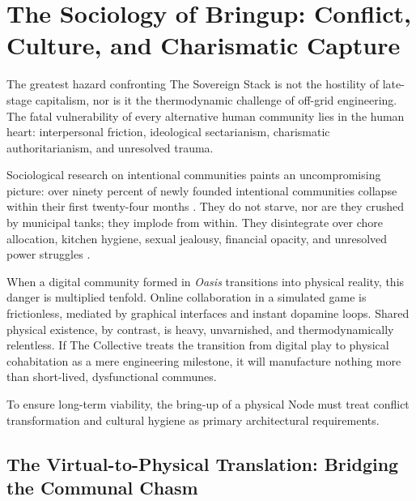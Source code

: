 \section[The Sociology of Bringup]{The Sociology of Bringup: Conflict, Culture, and Charismatic Capture}
\label{sec:bringup-sociology}

The greatest hazard confronting The Sovereign Stack is not the hostility of late-stage capitalism, nor is it the thermodynamic challenge of off-grid engineering. The fatal vulnerability of every alternative human community lies in the human heart: interpersonal friction, ideological sectarianism, charismatic authoritarianism, and unresolved trauma.

Sociological research on intentional communities paints an uncompromising picture: over ninety percent of newly founded intentional communities collapse within their first twenty-four months \parencite{christian2003}. They do not starve, nor are they crushed by municipal tanks; they implode from within. They disintegrate over chore allocation, kitchen hygiene, sexual jealousy, financial opacity, and unresolved power struggles \parencite{kanter1972}.

When a digital community formed in \textit{Oasis} transitions into physical reality, this danger is multiplied tenfold. Online collaboration in a simulated game is frictionless, mediated by graphical interfaces and instant dopamine loops. Shared physical existence, by contrast, is heavy, unvarnished, and thermodynamically relentless. If The Collective treats the transition from digital play to physical cohabitation as a mere engineering milestone, it will manufacture nothing more than short-lived, dysfunctional communes.

To ensure long-term viability, the bring-up of a physical Node must treat conflict transformation and cultural hygiene as primary architectural requirements.

\subsection{The Virtual-to-Physical Translation: Bridging the Communal Chasm}

